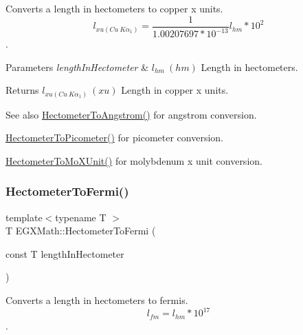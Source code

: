 Converts a length in hectometers to copper x units. \[ l_{xu(Cu\ K\alpha_1)}= \frac{1}{1.00207697*10^{-13}} l_{hm} * 10^{2}\]. 


\begin{DoxyParams}{Parameters}
{\em length\+In\+Hectometer} & $ l_{hm}\ (hm)$ Length in hectometers. \\
\hline
\end{DoxyParams}
\begin{DoxyReturn}{Returns}
$ l_{xu(Cu\ K\alpha_1)}\ (xu)$ Length in copper x units. 
\end{DoxyReturn}
\begin{DoxySeeAlso}{See also}
\mbox{\hyperlink{group___e_g_x_math-_conversions-_length_conversions-_s_i-_hectometer-_non-_s_i_gad1296c0169aa8a99802a30b65a2ea516}{Hectometer\+To\+Angstrom()}} for angstrom conversion. 

\mbox{\hyperlink{group___e_g_x_math-_conversions-_length_conversions-_s_i-_hectometer-_s_i_gaa45a09cd750ee4e48680332f0ce39f07}{Hectometer\+To\+Picometer()}} for picometer conversion. 

\mbox{\hyperlink{group___e_g_x_math-_conversions-_length_conversions-_s_i-_hectometer-_non-_s_i_gac2840604040746ae9a4c51fd1bb3e6f6}{Hectometer\+To\+Mo\+X\+Unit()}} for molybdenum x unit conversion. 
\end{DoxySeeAlso}
\mbox{\label{group___e_g_x_math-_conversions-_length_conversions-_s_i-_hectometer-_non-_s_i_gabd26977f3d5ad9d0560afb10be63a598}} 
\subsubsection{\texorpdfstring{Hectometer\+To\+Fermi()}{HectometerToFermi()}}
{\footnotesize\ttfamily template$<$typename T $>$ \\
T E\+G\+X\+Math\+::\+Hectometer\+To\+Fermi (\begin{DoxyParamCaption}\item[{const T}]{length\+In\+Hectometer }\end{DoxyParamCaption})}



Converts a length in hectometers to fermis. \[ l_{fm}=l_{hm} * 10^{17} \]. 


